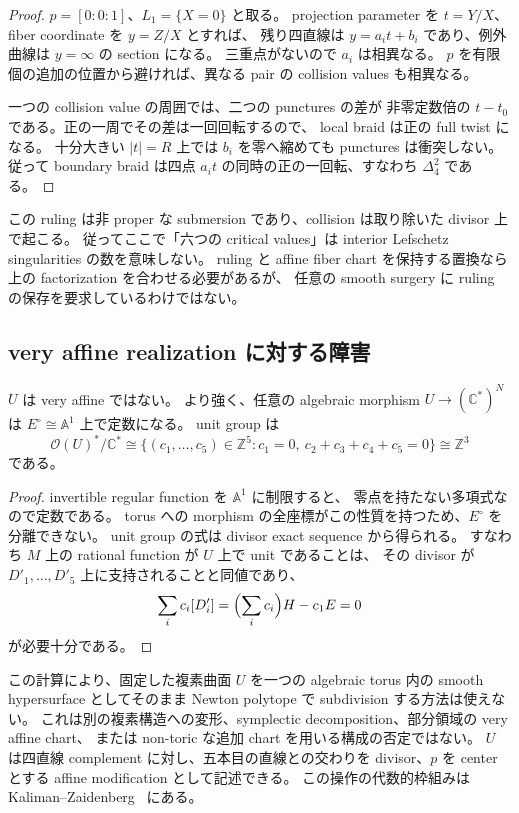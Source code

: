 \begin{proof}
$p=[0:0:1]$、$L_1=\{X=0\}$ と取る。
projection parameter を $t=Y/X$、fiber coordinate を $y=Z/X$ とすれば、
残り四直線は $y=a_it+b_i$ であり、例外曲線は $y=\infty$ の section になる。
三重点がないので $a_i$ は相異なる。
$p$ を有限個の追加の位置から避ければ、異なる pair の collision values も相異なる。

一つの collision value の周囲では、二つの punctures の差が
非零定数倍の $t-t_0$ である。正の一周でその差は一回回転するので、
local braid は正の full twist になる。
十分大きい $|t|=R$ 上では $b_i$ を零へ縮めても punctures は衝突しない。
従って boundary braid は四点 $a_it$ の同時の正の一回転、すなわち $\Delta_4^2$ である。
\end{proof}

この ruling は非 proper な submersion であり、collision は取り除いた divisor 上で起こる。
従ってここで「六つの critical values」は interior Lefschetz singularities の数を意味しない。
ruling と affine fiber chart を保持する置換なら上の factorization を合わせる必要があるが、
任意の smooth surgery に ruling の保存を要求しているわけではない。

\subsection{very affine realization に対する障害}

\begin{proposition}
\label{cs6:veryaffine}
$U$ は very affine ではない。
より強く、任意の algebraic morphism $U\to(\mathbb C^*)^N$ は
$E^\circ\cong\mathbb A^1$ 上で定数になる。
unit group は
\[
 \mathcal O(U)^*/\mathbb C^*\cong
 \{(c_1,\ldots,c_5)\in\mathbb Z^5:
 c_1=0,\ c_2+c_3+c_4+c_5=0\}\cong\mathbb Z^3
\]
である。
\end{proposition}

\begin{proof}
invertible regular function を $\mathbb A^1$ に制限すると、
零点を持たない多項式なので定数である。
torus への morphism の全座標がこの性質を持つため、$E^\circ$ を分離できない。
unit group の式は divisor exact sequence から得られる。
すなわち $M$ 上の rational function が $U$ 上で unit であることは、
その divisor が $D'_1,\ldots,D'_5$ 上に支持されることと同値であり、
\[
 \sum_i c_i[D'_i]
 =\Bigl(\sum_i c_i\Bigr)H-c_1E=0
\]
が必要十分である。
\end{proof}

この計算により、固定した複素曲面 $U$ を一つの algebraic torus 内の smooth hypersurface
としてそのまま Newton polytope で subdivision する方法は使えない。
これは別の複素構造への変形、symplectic decomposition、部分領域の very affine chart、
または non-toric な追加 chart を用いる構成の否定ではない。
$U$ は四直線 complement に対し、五本目の直線との交わりを divisor、$p$ を center とする
affine modification として記述できる。
この操作の代数的枠組みは Kaliman--Zaidenberg~\cite[\S\S1--3]{KalimanZaidenberg} にある。

